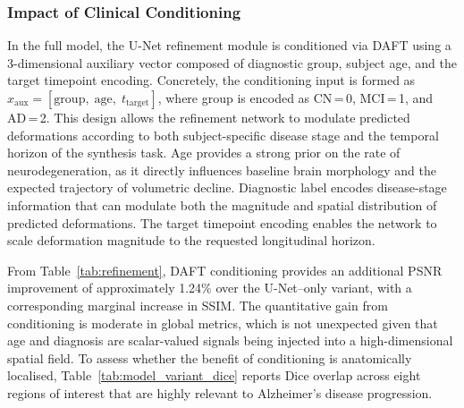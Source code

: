 
\subsubsection{Impact of Clinical Conditioning}

In the full model, the U-Net refinement module is conditioned via DAFT using a 3-dimensional auxiliary vector composed of diagnostic group, subject age, and the target timepoint encoding. Concretely, the conditioning input is formed as $x_{\mathrm{aux}} = [\mathrm{group},\; \mathrm{age},\; t_{\mathrm{target}}]$, where group is encoded as CN\,=\,0, MCI\,=\,1, and AD\,=\,2. This design allows the refinement network to modulate predicted deformations according to both subject-specific disease stage and the temporal horizon of the synthesis task. Age provides a strong prior on the rate of neurodegeneration, as it directly influences baseline brain morphology and the expected trajectory of volumetric decline. Diagnostic label encodes disease-stage information that can modulate both the magnitude and spatial distribution of predicted deformations. The target timepoint encoding enables the network to scale deformation magnitude to the requested longitudinal horizon.

From Table~\ref{tab:refinement}, DAFT conditioning provides an additional PSNR improvement of approximately 1.24\% over the U-Net--only variant, with a corresponding marginal increase in SSIM. The quantitative gain from conditioning is moderate in global metrics, which is not unexpected given that age and diagnosis are scalar-valued signals being injected into a high-dimensional spatial field. To assess whether the benefit of conditioning is anatomically localised, Table~\ref{tab:model_variant_dice} reports Dice overlap across eight regions of interest that are highly relevant to Alzheimer's disease progression.

